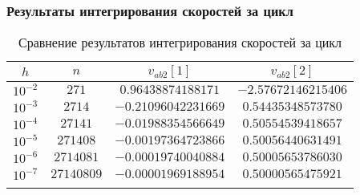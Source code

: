 \begin{frame}
\frametitle{Результаты интегрирования скоростей за цикл}

\begin{table}[h]
  \centering
  \caption{Сравнение результатов интегрирования скоростей за цикл}
  \begin{tabular}{cccc}
    \toprule
    $ h $ &
    $ n $ &
    $ v_{ab2}[1] $ &
    $ v_{ab2}[2] $ \\
    \midrule
    $ 10^{-2} $ & $ 271 $ & $ 0.96438874188171 $ & $ -2.57672146215406 $ \\
    \arrayrulecolor{black!40}
    \midrule
    $ 10^{-3} $ & $ 2714 $ & $ -0.21096042231669 $ & $ 0.54435348573780 $ \\
    \midrule
    $ 10^{-4} $ & $ 27141 $ & $ -0.01988354566649 $ & $ 0.50554539418657 $ \\
    \midrule
    $ 10^{-5} $ & $ 271408 $ & $ -0.00197364723866 $ & $ 0.50056440631491 $ \\
    \midrule
    $ 10^{-6} $ & $ 2714081 $ & $ -0.00019740040884 $ & $ 0.50005653786030 $ \\
    \midrule
    $ 10^{-7} $ & $ 27140809 $ & $ -0.00001969188954 $ & $ 0.50000565475921 $ \\
    \arrayrulecolor{black}
    \bottomrule
  \end{tabular}
\end{table}

\end{frame}

